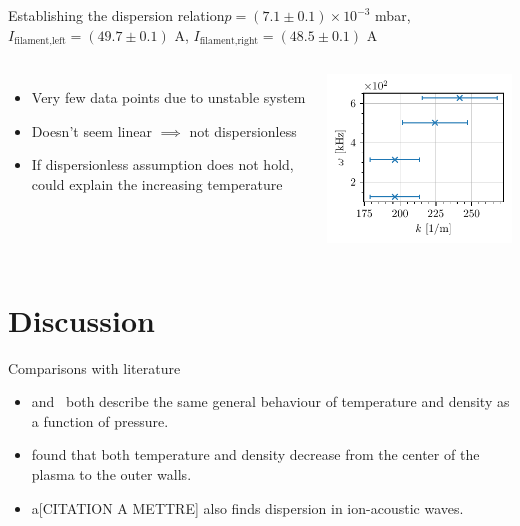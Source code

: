 \documentclass[10pt]{beamer}
\begin{document}
\begin{frame}{Establishing the dispersion relation}{$p = (7.1 \pm 0.1) \times 10^{-3}$ mbar, $I_\text{filament,left} = (49.7 \pm 0.1)$ A, $I_\text{filament,right} = (48.5 \pm 0.1)$ A}
    \begin{columns}
        \centering
        \vspace{-1cm}
        \begin{itemize}
            \item Very few data points due to unstable system
            \item Doesn't seem linear $\implies$ not dispersionless
            \item If dispersionless assumption does not hold, could explain the increasing temperature
        \end{itemize}
        
        \centering
        \includegraphics[scale=1]{../figures/dispersion_relation.pdf}
    \end{columns}
\end{frame}

\section{Discussion}
\begin{frame}{Comparisons with literature}
    \begin{itemize}
        \item {} and \,  both describe the same general behaviour of temperature and density as a function of pressure.
        \item {} found that both temperature and density decrease from the center of the plasma to the outer walls.
        \item a[CITATION A METTRE] also finds dispersion in ion-acoustic waves.
    \end{itemize}
\end{frame}
\end{document}
